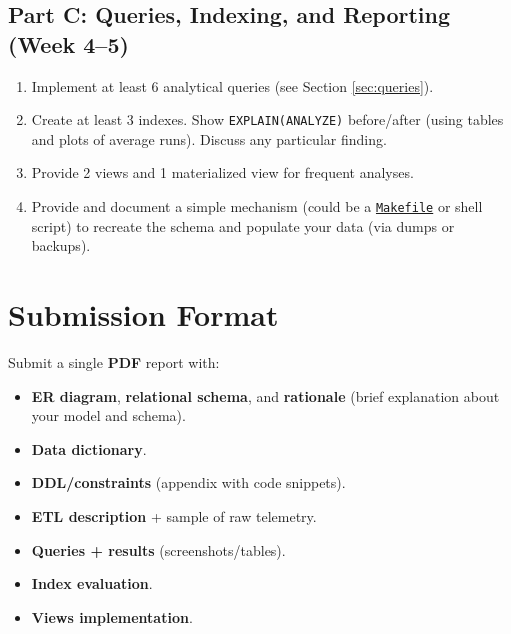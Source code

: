 \documentclass[11pt]{article}
\begin{document}
\subsection*{Part C: Queries, Indexing, and Reporting (Week 4--5)}
\begin{enumerate}[leftmargin=*]
  \item Implement at least 6 analytical queries (see Section \ref{sec:queries}).
  \item Create at least 3 indexes. Show \texttt{EXPLAIN(ANALYZE)} before/after (using tables and plots of average runs).  Discuss any particular finding.
  \item Provide 2 views and 1 materialized view for frequent analyses.
  \item Provide and document a simple mechanism (could be a \href{https://en.wikipedia.org/wiki/Make_(software)}{\texttt{Makefile}} or shell script) to recreate the schema and populate your data (via dumps or backups).
\end{enumerate}

\section{Submission Format}

Submit a single \textbf{\large PDF} report with:
\begin{itemize}[leftmargin=*]
  \item \textbf{ER diagram}, \textbf{relational schema}, and \textbf{rationale} (brief explanation about your model and schema).
  \item \textbf{Data dictionary}.
  \item \textbf{DDL/constraints} (appendix with code snippets).
  \item \textbf{ETL description} + sample of raw telemetry.
  \item \textbf{Queries + results} (screenshots/tables).
  \item \textbf{Index evaluation}.
  \item \textbf{Views implementation}.
\end{itemize}
\end{document}
